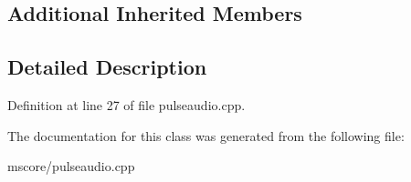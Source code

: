 \subsection*{Additional Inherited Members}


\subsection{Detailed Description}


Definition at line 27 of file pulseaudio.\+cpp.



The documentation for this class was generated from the following file\+:\begin{DoxyCompactItemize}
\item 
mscore/pulseaudio.\+cpp\end{DoxyCompactItemize}
